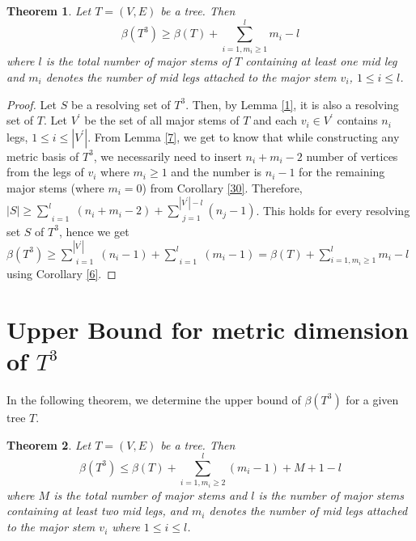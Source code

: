 \documentclass{article}
\newtheorem{thm}{Theorem}[section]
\theoremstyle{definition}
\numberwithin{equation}{section}
\begin{document}
 \begin{thm}\label{lowerbound}
Let $T=(V,E)$ be a tree. Then \[\beta(T^{3})\geq\beta(T)+\sum_{i=1,m_{i}\geq 1}^{l}{m_{i}}-l\] where $l$ is the total number of major stems of $T$ containing at least one mid leg and $m_{i}$ denotes the number of mid legs attached to the major stem $v_{i}$, $1\leq i\leq l$.  
\end{thm}

\begin{proof}
Let $S$ be a resolving set of $T^{3}$. Then, by Lemma \ref{1}, it is also a resolving set of $T$. Let $V^{\prime}$ be the set of all major stems of $T$ and each $v_{i}\in V^{\prime}$ contains $n_{i}$ legs, $1\leq i\leq |V^{\prime}|$. From Lemma \ref{7}, we get to know that while constructing any metric basis of $T^{3}$, we necessarily need to insert $n_{i}+m_{i}-2$ number of vertices from the legs of $v_{i}$ where $m_{i}\geq 1$ and the number is $n_{i}-1$ for the remaining major stems (where $m_{i}=0$) from Corollary \ref{30}. Therefore, $|S|\geq \sum\limits_{\substack{i=1}}^{l}(n_{i}+m_{i}-2)+\sum\limits_{\substack{j=1}}^{|V^{\prime}|-l} (n_{j}-1)$. This holds for every resolving set $S$ of $T^{3}$, hence we get $\beta(T^{3})\geq \sum\limits_{\substack{i=1}}^{|V^{\prime}|}(n_{i}-1)+\sum\limits_{\substack{i=1}}^{l} (m_{i}-1)=\beta{(T)}+\sum\limits_{i=1,m_{i}\geq 1}^{l}{m_{i}}-l$ using Corollary \ref{6}.
\end{proof}

\section{Upper Bound for metric dimension of $T^{3}$}  
\noindent In the following theorem, we determine the upper bound of $\beta(T^{3})$ for a given tree $T$.  


\begin{thm}\label{upperbound}
Let $T=(V, E)$ be a tree. Then \[\beta{(T^{3})}\leq \beta{(T)}+\sum_{i=1,m_{i}\geq 2}^{l} (m_{i}-1)+M+1-l\] where $M$ is the total number of major stems and $l$ is the number of major stems containing at least two mid legs, and $m_{i}$ denotes the number of mid legs attached to the major stem $v_{i}$ where $1\leq i\leq l$.
\end{thm}
\end{document}
